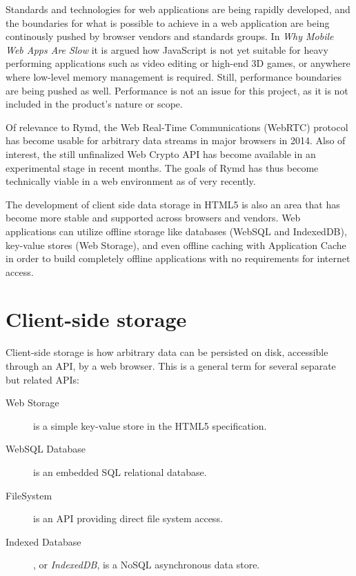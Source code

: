 Standards and technologies for web applications are being rapidly developed, and the boundaries for what is possible to achieve in a web application are being continously pushed by browser vendors and standards groups. In \emph{Why Mobile Web Apps Are Slow} \cite{MobileApps:Online} it is argued how JavaScript is not yet suitable for heavy performing applications such as video editing or high-end 3D games, or anywhere where low-level memory management is required. Still, performance boundaries are being pushed as well. Performance is not an issue for this project, as it is not included in the product's nature or scope.

Of relevance to Rymd, the Web Real-Time Communications (WebRTC) protocol \cite{WebRTC:Online} has become usable for arbitrary data streams in major browsers in 2014\cite{WebRTCChrome:Online}\cite{WebRTCFirefox:Online}. Also of interest, the still unfinalized Web Crypto API \cite{WebCrypto:Online} has become available in an experimental stage in recent months. The goals of Rymd has thus become technically viable in a web environment as of very recently.

The development of client side data storage in HTML5 is also an area that has become more stable and supported across browsers and vendors. Web applications can utilize offline storage like databases (WebSQL and IndexedDB), key-value stores (Web Storage), and even offline caching with Application Cache \cite{OfflineWebApps:Online} in order to build completely offline applications with no requirements for internet access.

\section{Client-side storage}

Client-side storage is how arbitrary data can be persisted on disk, accessible through an API, by a web browser. This is a general term for several separate but related APIs:

\begin{description}
  \item[Web Storage]\cite{WebStorage:Online} is a simple key-value store in the HTML5 specification.
  \item[WebSQL Database]\cite{WebSQL:Online} is an embedded SQL relational database.
  \item[FileSystem]\cite{FileSystem:Online} is an API providing direct file system access.
  \item[Indexed Database]\cite{IndexedDB:Online}, or \emph{IndexedDB}, is a NoSQL asynchronous data store.
\end{description}

